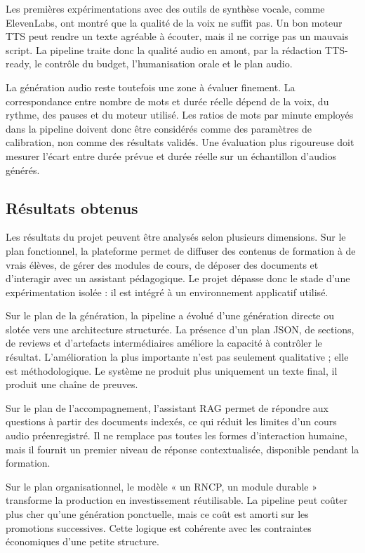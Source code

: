 Les premières expérimentations avec des outils de synthèse vocale, comme ElevenLabs,
ont montré que la qualité de la voix ne suffit pas. Un bon moteur TTS peut rendre un
texte agréable à écouter, mais il ne corrige pas un mauvais script. La pipeline traite donc
la qualité audio en amont, par la rédaction TTS-ready, le contrôle du budget, l'humanisation
orale et le plan audio.

La génération audio reste toutefois une zone à évaluer finement. La correspondance entre
nombre de mots et durée réelle dépend de la voix, du rythme, des pauses et du moteur
utilisé. Les ratios de mots par minute employés dans la pipeline doivent donc être
considérés comme des paramètres de calibration, non comme des résultats validés. Une
évaluation plus rigoureuse doit mesurer l'écart entre durée prévue et durée réelle sur un
échantillon d'audios générés.

\subsection{Résultats obtenus}

Les résultats du projet peuvent être analysés selon plusieurs dimensions. Sur le plan
fonctionnel, la plateforme permet de diffuser des contenus de formation à de vrais élèves,
de gérer des modules de cours, de déposer des documents et d'interagir avec un assistant
pédagogique. Le projet dépasse donc le stade d'une expérimentation isolée : il est intégré
à un environnement applicatif utilisé.

Sur le plan de la génération, la pipeline a évolué d'une génération directe ou slotée vers
une architecture structurée. La présence d'un plan JSON, de sections, de reviews et
d'artefacts intermédiaires améliore la capacité à contrôler le résultat. L'amélioration la
plus importante n'est pas seulement qualitative ; elle est méthodologique. Le système ne
produit plus uniquement un texte final, il produit une chaîne de preuves.

Sur le plan de l'accompagnement, l'assistant RAG permet de répondre aux questions à
partir des documents indexés, ce qui réduit les limites d'un cours audio préenregistré. Il
ne remplace pas toutes les formes d'interaction humaine, mais il fournit un premier niveau
de réponse contextualisée, disponible pendant la formation.

Sur le plan organisationnel, le modèle « un RNCP, un module durable » transforme la
production en investissement réutilisable. La pipeline peut coûter plus cher qu'une
génération ponctuelle, mais ce coût est amorti sur les promotions successives. Cette
logique est cohérente avec les contraintes économiques d'une petite structure.

